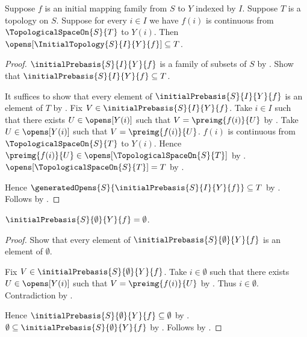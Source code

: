 \begin{theorem}\label{initial_topology_is_coarsest}
    Suppose $f$ is an initial mapping family from $S$ to $Y$ indexed by $I$.
    Suppose $T$ is a topology on $S$.
    Suppose for every $i\in I$ we have
        $f(i)$ is continuous from $\TopologicalSpaceOn{S}{T}$ to $Y(i)$.
    Then $\opens[\InitialTopology{S}{I}{Y}{f}]\subseteq T$.
\end{theorem}
\begin{proof}
    $\initialPrebasis{S}{I}{Y}{f}$ is a family of subsets of $S$ by
        .
    Show that $\initialPrebasis{S}{I}{Y}{f}\subseteq T$.
    \begin{subproof}
        It suffices to show that every element of
            $\initialPrebasis{S}{I}{Y}{f}$ is an element of $T$ by
            .
        Fix $V\in\initialPrebasis{S}{I}{Y}{f}$.
        Take $i\in I$ such that there exists $U\in\opens[Y(i)]$
            such that $V=\preimg{f(i)}{U}$ by
            .
        Take $U\in\opens[Y(i)]$ such that
            $V=\preimg{f(i)}{U}$.
        $f(i)$ is continuous from $\TopologicalSpaceOn{S}{T}$ to $Y(i)$.
        Hence $\preimg{f(i)}{U}\in
            \opens[\TopologicalSpaceOn{S}{T}]$ by
            .
        $\opens[\TopologicalSpaceOn{S}{T}]=T$ by
            .
    \end{subproof}
    Hence $\generatedOpens{S}{\initialPrebasis{S}{I}{Y}{f}}
        \subseteq T$ by .
    Follows by .
\end{proof}

\begin{proposition}\label{empty_initial_prebasis}
    $\initialPrebasis{S}{\emptyset}{Y}{f}=\emptyset$.
\end{proposition}
\begin{proof}
    Show that every element of $\initialPrebasis{S}{\emptyset}{Y}{f}$
        is an element of $\emptyset$.
    \begin{subproof}
        Fix $V\in\initialPrebasis{S}{\emptyset}{Y}{f}$.
        Take $i\in\emptyset$ such that there exists
            $U\in\opens[Y(i)]$ such that $V=\preimg{f(i)}{U}$ by
            .
        Thus $i\in\emptyset$.
        Contradiction by .
    \end{subproof}
    Hence $\initialPrebasis{S}{\emptyset}{Y}{f}\subseteq\emptyset$ by
        .
    $\emptyset\subseteq\initialPrebasis{S}{\emptyset}{Y}{f}$ by
        .
    Follows by .
\end{proof}

